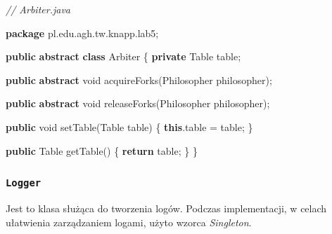 \documentclass[11pt]{article}
\newenvironment{Shaded}{}{}
\newcommand{\KeywordTok}[1]{\textcolor[rgb]{0.00,0.44,0.13}{\textbf{{#1}}}}
\newcommand{\DataTypeTok}[1]{\textcolor[rgb]{0.56,0.13,0.00}{{#1}}}
\newcommand{\CommentTok}[1]{\textcolor[rgb]{0.38,0.63,0.69}{\textit{{#1}}}}
\newcommand{\FunctionTok}[1]{\textcolor[rgb]{0.02,0.16,0.49}{{#1}}}
\newcommand{\NormalTok}[1]{{#1}}
\newcommand{\ImportTok}[1]{{#1}}
\newcommand{\ControlFlowTok}[1]{\textcolor[rgb]{0.00,0.44,0.13}{\textbf{{#1}}}}
\newcommand{\OperatorTok}[1]{\textcolor[rgb]{0.40,0.40,0.40}{{#1}}}
\begin{document}
\begin{Shaded}
\begin{Highlighting}[]
\CommentTok{// Arbiter.java}

\KeywordTok{package}\ImportTok{ pl}\OperatorTok{.}\ImportTok{edu}\OperatorTok{.}\ImportTok{agh}\OperatorTok{.}\ImportTok{tw}\OperatorTok{.}\ImportTok{knapp}\OperatorTok{.}\ImportTok{lab5}\OperatorTok{;}

\KeywordTok{public} \KeywordTok{abstract} \KeywordTok{class}\NormalTok{ Arbiter }\OperatorTok{\{}
    \KeywordTok{private}\NormalTok{ Table table}\OperatorTok{;}

    \KeywordTok{public} \KeywordTok{abstract} \DataTypeTok{void} \FunctionTok{acquireForks}\OperatorTok{(}\NormalTok{Philosopher philosopher}\OperatorTok{);}

    \KeywordTok{public} \KeywordTok{abstract} \DataTypeTok{void} \FunctionTok{releaseForks}\OperatorTok{(}\NormalTok{Philosopher philosopher}\OperatorTok{);}

    \KeywordTok{public} \DataTypeTok{void} \FunctionTok{setTable}\OperatorTok{(}\NormalTok{Table table}\OperatorTok{)} \OperatorTok{\{}
        \KeywordTok{this}\OperatorTok{.}\FunctionTok{table} \OperatorTok{=}\NormalTok{ table}\OperatorTok{;}
    \OperatorTok{\}}

    \KeywordTok{public}\NormalTok{ Table }\FunctionTok{getTable}\OperatorTok{()} \OperatorTok{\{}
        \ControlFlowTok{return}\NormalTok{ table}\OperatorTok{;}
    \OperatorTok{\}}
\OperatorTok{\}}
\end{Highlighting}
\end{Shaded}

    \hypertarget{logger}{%
\subsubsection{\texorpdfstring{\texttt{Logger}}{Logger}}\label{logger}}

Jest to klasa służąca do tworzenia logów. Podczas implementacji, w
celach ułatwienia zarządzaniem logami, użyto wzorca \emph{Singleton}.
\end{document}
